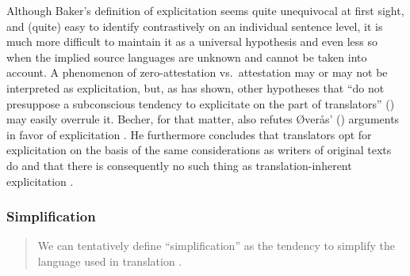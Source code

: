 Although Baker’s definition of explicitation seems quite unequivocal at first sight, and (quite) easy to identify contrastively on an individual sentence level, it is much more difficult to maintain it as a universal hypothesis and even less so when the implied source languages are unknown and cannot be taken into account. A phenomenon of zero-attestation vs.\ attestation may or may not be interpreted as explicitation, but, as \citet{becher_abandoning_2010} has shown, other hypotheses that “do not presuppose a subconscious tendency to explicitate on the part of translators” (\citeyear[11]{becher_abandoning_2010}) may easily overrule it. Becher, for that matter, also refutes Øverås’ (\citeyear{overas_search_1998}) arguments in favor of explicitation \citep[12--16]{becher_abandoning_2010}. He furthermore concludes that translators opt for explicitation on the basis of the same considerations as writers of original texts do and that there is consequently no such thing as translation-inherent explicitation \citep[22--23]{becher_abandoning_2010}.

\subsubsection{Simplification}
\label{sec:2.2.2.2}  
\begin{quote}
We can tentatively define “simplification” as the tendency to simplify the language used in translation \citep[181]{baker_corpus-based_1996}.
\end{quote}

